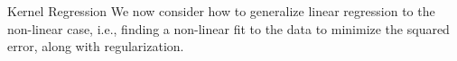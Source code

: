%
%
%

\begin{frame}{Kernel Regression}
%
We now consider how to generalize linear regression to the non-linear
case, i.e., finding a non-linear fit to the data to minimize the squared
error, along with regularization. 


\end{frame}
